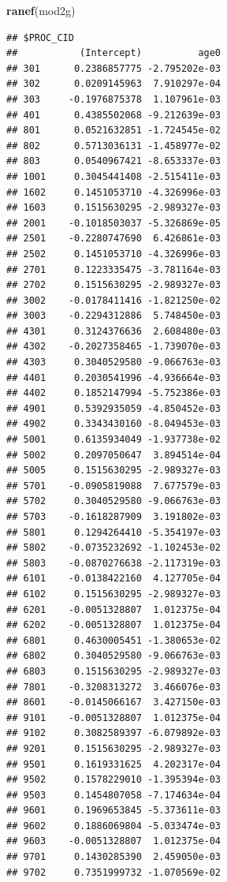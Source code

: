 \documentclass[ignorenonframetext,]{beamer}
\newenvironment{Shaded}{\begin{snugshade}}{\end{snugshade}}
\newcommand{\KeywordTok}[1]{\textcolor[rgb]{0.13,0.29,0.53}{\textbf{{#1}}}}
\newcommand{\NormalTok}[1]{{#1}}
\begin{document}
\begin{frame}[fragile]

\small

\begin{Shaded}
\begin{Highlighting}[]
\KeywordTok{ranef}\NormalTok{(mod2g)}
\end{Highlighting}
\end{Shaded}

\begin{verbatim}
## $PROC_CID
##           (Intercept)          age0
## 301      0.2386857775 -2.795202e-03
## 302      0.0209145963  7.910297e-04
## 303     -0.1976875378  1.107961e-03
## 401      0.4385502068 -9.212639e-03
## 801      0.0521632851 -1.724545e-02
## 802      0.5713036131 -1.458977e-02
## 803      0.0540967421 -8.653337e-03
## 1001     0.3045441408 -2.515411e-03
## 1602     0.1451053710 -4.326996e-03
## 1603     0.1515630295 -2.989327e-03
## 2001    -0.1018503037 -5.326869e-05
## 2501    -0.2280747690  6.426861e-03
## 2502     0.1451053710 -4.326996e-03
## 2701     0.1223335475 -3.781164e-03
## 2702     0.1515630295 -2.989327e-03
## 3002    -0.0178411416 -1.821250e-02
## 3003    -0.2294312886  5.748450e-03
## 4301     0.3124376636  2.608480e-03
## 4302    -0.2027358465 -1.739070e-03
## 4303     0.3040529580 -9.066763e-03
## 4401     0.2030541996 -4.936664e-03
## 4402     0.1852147994 -5.752386e-03
## 4901     0.5392935059 -4.850452e-03
## 4902     0.3343430160 -8.049453e-03
## 5001     0.6135934049 -1.937738e-02
## 5002     0.2097050647  3.894514e-04
## 5005     0.1515630295 -2.989327e-03
## 5701    -0.0905819088  7.677579e-03
## 5702     0.3040529580 -9.066763e-03
## 5703    -0.1618287909  3.191802e-03
## 5801     0.1294264410 -5.354197e-03
## 5802    -0.0735232692 -1.102453e-02
## 5803    -0.0870276638 -2.117319e-03
## 6101    -0.0138422160  4.127705e-04
## 6102     0.1515630295 -2.989327e-03
## 6201    -0.0051328807  1.012375e-04
## 6202    -0.0051328807  1.012375e-04
## 6801     0.4630005451 -1.380653e-02
## 6802     0.3040529580 -9.066763e-03
## 6803     0.1515630295 -2.989327e-03
## 7801    -0.3208313272  3.466076e-03
## 8601    -0.0145066167  3.427150e-03
## 9101    -0.0051328807  1.012375e-04
## 9102     0.3082589397 -6.079892e-03
## 9201     0.1515630295 -2.989327e-03
## 9501     0.1619331625  4.202317e-04
## 9502     0.1578229010 -1.395394e-03
## 9503     0.1454807058 -7.174634e-04
## 9601     0.1969653845 -5.373611e-03
## 9602     0.1886069804 -5.033474e-03
## 9603    -0.0051328807  1.012375e-04
## 9701     0.1430285390  2.459050e-03
## 9702     0.7351999732 -1.070569e-02

\end{verbatim}
\end{frame}
\end{document}
